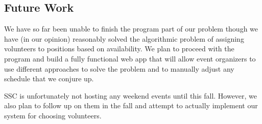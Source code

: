\documentclass[11pt]{article}
\theoremstyle{definition}
\begin{document}
\begin{multicols}{2}
\section{Future Work}
We have so far been unable to finish the program part of our problem though we have (in our opinion) reasonably solved the algorithmic problem of assigning volunteers to positions based on availability.
We plan to proceed with the program and build a fully functional web app that will allow event organizers to use different approaches to solve the problem and to manually adjust any schedule that we conjure up.

SSC is unfortunately not hosting any weekend events until this fall.
However, we also plan to follow up on them in the fall and attempt to actually implement our system for choosing volunteers.

\end{multicols}
\end{document}
